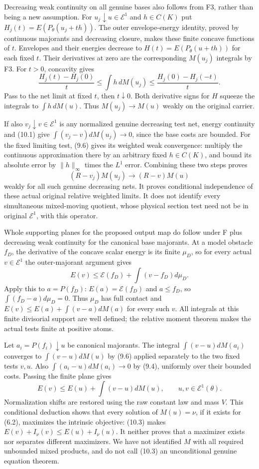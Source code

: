 \documentclass[10pt]{article}
\newcommand{\E}{\mathcal E}
\begin{document}
Decreasing weak continuity on all genuine bases also follows from F3,
rather than being a new assumption. For $u_j\downarrow u\in\E^1$ and
$h\in C(K)$ put $H_j(t)=E(P_\theta(u_j+th))$.
The outer envelope-energy identity, proved by continuous majorants and
decreasing closure, makes these finite concave functions of $t$.
Envelopes and their energies decrease to $H(t)=E(P_\theta(u+th))$ for
each fixed $t$. Their derivatives at zero are the corresponding
$M(u_j)$ integrals by F3. For $t>0$, concavity gives
\[
 \frac{H_j(t)-H_j(0)}t\leq\int h\,dM(u_j)
 \leq\frac{H_j(0)-H_j(-t)}t.
\]
Pass to the net limit at fixed $t$, then $t\downarrow0$. Both derivative
signs for $H$ squeeze the integrals to $\int h\,dM(u)$.
Thus $M(u_j)\to M(u)$ weakly on the original carrier.

If also $v_j\downarrow v\in\E^1$ is any normalized genuine decreasing
test net, energy continuity and (10.1) give
$\int(v_j-v)dM(u_j)\to0$, since the base costs are bounded.
For the fixed limiting test, (9.6) gives its weighted weak convergence:
multiply the continuous approximation there by an arbitrary fixed
$h\in C(K)$, and bound its absolute error by $\|h\|_\infty$ times the
$L^1$ error. Combining these two steps proves
\[
 (R-v_j)M(u_j)\longrightarrow(R-v)M(u)
\tag{10.2}
\]
weakly for all such genuine decreasing nets. It proves conditional
independence of these actual original relative weighted limits. It does
not identify every simultaneous mixed-moving quotient, whose physical
section test need not be in original $\E^1$, with this operator.

Whole supporting planes for the proposed output map do follow under F
plus decreasing weak continuity for the canonical base majorants. At a
model obstacle $f_D$, the derivative of the concave scalar energy is its
finite $\mu_D$, so for every actual $v\in\E^1$ the outer-majorant
argument gives
\[
 E(v)\leq\mathscr E(f_D)+\int(v-f_D)d\mu_D.
\]
Apply this to $a=P(f_D)$: $E(a)=\mathscr E(f_D)$ and $a\leq f_D$, so
$\int(f_D-a)d\mu_D=0$. Thus $\mu_D$ has full contact and
$E(v)\leq E(a)+\int(v-a)dM(a)$ for every such $v$.
All integrals at this finite divisorial support are well defined; the
relative moment theorem makes the actual tests finite at positive atoms.

Let $a_i=P(f_i)\downarrow u$ be canonical majorants. The integral
$\int(v-u)dM(a_i)$ converges to $\int(v-u)dM(u)$ by (9.6) applied
separately to the two fixed tests $v,u$. Also
$\int(a_i-u)dM(a_i)\to0$ by (9.4), uniformly over their bounded costs.
Passing the finite plane gives
\[
 E(v)\leq E(u)+\int(v-u)dM(u),\qquad u,v\in\E^1(\theta).
\tag{10.3}
\]
Normalization shifts are restored using the raw constant law and mass $V$.
This conditional deduction shows that every solution of $M(u)=\nu$, if
it exists for (6.2), maximizes the intrinsic objective: (10.3) makes
$E(v)+I_\nu(v)\leq E(u)+I_\nu(u)$.
It neither proves that a maximizer exists nor separates different maximizers.
We have not identified $M$ with all required unbounded mixed products, and
do not call (10.3) an unconditional genuine equation theorem.
\end{document}

